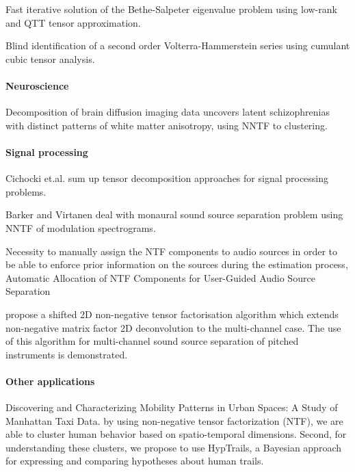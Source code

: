 \documentclass[letterpaper,12pt]{article}
\begin{document}
\cite{Benner2016} Fast iterative solution of the Bethe-Salpeter eigenvalue problem using low-rank and QTT tensor approximation.


\cite{Cherif2008} Blind identification of a second order Volterra-Hammerstein series using cumulant cubic tensor analysis.

\paragraph{Neuroscience}

\cite{Arnedo2015} Decomposition of brain diffusion imaging data uncovers latent schizophrenias with distinct patterns of white matter anisotropy, using NNTF to clustering.


\paragraph{Signal processing}

Cichocki et.al. \cite{Cichocki2015} sum up tensor decomposition approaches for signal processing problems.

Barker and Virtanen \cite{Barker2014} deal with monaural sound source separation problem using NNTF of modulation spectrograms.

\cite{Bilen2016} Necessity to manually assign the NTF components to audio sources in order to be able to enforce prior information on the sources during the estimation process, Automatic Allocation of NTF Components for User-Guided Audio Source Separation

\cite{Fitzgerald2006} propose a shifted 2D non-negative tensor factorisation algorithm which extends non-negative matrix factor 2D deconvolution to the multi-channel case. The use of this algorithm for multi-channel sound source separation of pitched instruments is demonstrated.

\paragraph{Other applications}

\cite{Espin-Noboa2016} Discovering and Characterizing Mobility Patterns in Urban Spaces: A Study of Manhattan Taxi Data. by using non-negative tensor factorization (NTF), we are able to cluster human behavior based on spatio-temporal dimensions. Second, for understanding these clusters, we propose to use HypTrails, a Bayesian approach for expressing and comparing hypotheses about human trails.
\end{document}
